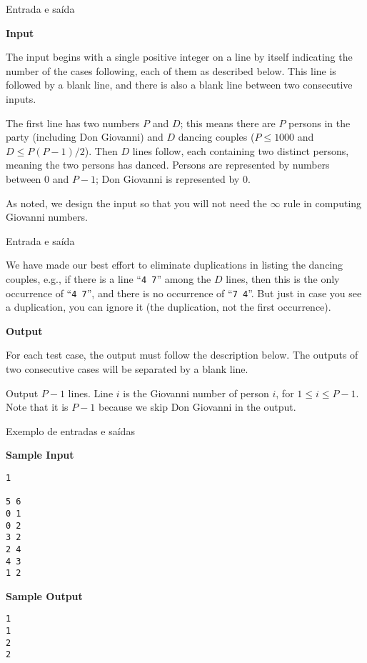 \begin{frame}[fragile]{Entrada e saída}

\textbf{Input}

The input begins with a single positive integer on a line by itself indicating the number of the 
cases following, each of them as described below. This line is followed by a blank line, and there 
is also a blank line between two consecutive inputs.

The first line has two numbers $P$ and $D$; this means there are $P$ persons in the party 
(including Don Giovanni) and $D$ dancing couples ($P\leq 1000$ and $D\leq P(P - 1)/2$). Then 
$D$ lines follow, each containing two distinct persons, meaning the two persons has danced. 
Persons are represented by numbers between 0 and $P - 1$; Don Giovanni is represented by 0.

As noted, we design the input so that you will not need the $\infty$ rule in computing Giovanni 
numbers.

\end{frame}

\begin{frame}[fragile]{Entrada e saída}

We have made our best effort to eliminate duplications in listing the dancing couples, e.g., if 
there is a line “\texttt{4 7}” among the $D$ lines, then this is the only occurrence of 
“\texttt{4 7}”, and there is no occurrence of “\texttt{7 4}”. But just in case you see a 
duplication, you can ignore it (the duplication, not the first occurrence).

\textbf{Output}

For each test case, the output must follow the description below. The outputs of two consecutive 
cases will be separated by a blank line.

Output $P - 1$ lines. Line $i$ is the Giovanni number of person $i$, for $1\leq i\leq P - 1$. Note 
that it is $P - 1$ because we skip Don Giovanni in the output.

\end{frame}

\begin{frame}[fragile]{Exemplo de entradas e saídas}
\begin{minipage}[t]{0.6\textwidth}
\textbf{Sample Input}
\begin{verbatim}
1

5 6
0 1
0 2
3 2
2 4
4 3
1 2
\end{verbatim}
\end{minipage}
\begin{minipage}[t]{0.35\textwidth}
\textbf{Sample Output}
\begin{verbatim}
1
1
2
2
\end{verbatim}
\end{minipage}
\end{frame}

